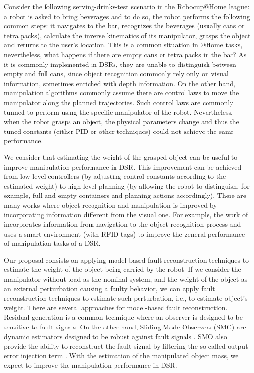 \documentclass[conference,letterpaper]{ieeeconf}
\begin{document}
Consider the following serving-drinks-test scenario in the Robocup@Home league: a robot is asked to bring beverages and to do so, the robot performs the following common steps: it navigates to the bar, recognizes the beverages (usually cans or tetra packs), calculate the inverse kinematics of its manipulator, grasps the object and returns to the user's location. This is a common situation in @Home tasks, nevertheless, what happens if there are empty cans or tetra packs in the bar? As it is commonly implemented in DSRs, they are unable to distinguish between empty and full cans, since object recognition commonly rely only on visual information, sometimes enriched with depth information. On the other hand, manipulation algorithms commonly assume there are control laws to move the manipulator along the planned trajectories. Such control laws are commonly tunned to perform using the specific manipulator of the robot. Nevertheless, when the robot grasps an object, the physical parameters change and thus the tuned constants (either PID or other techniques) could not achieve the same performance.

We consider that estimating the weight of the grasped object can be useful to improve manipulation performance in DSR. This improvement can be achieved from low-level controllers (by adjusting control constants according to the estimated weight) to high-level planning (by allowing the robot to distinguish, for example, full and empty containers and planning actions accordingly). There are many works where object recognition and manipulation is improved by incorporating information different from the visual one. For example, the work of \cite{ekvall_integrating_2006} incorporates information from navigation to the object recognition process and \cite{jae-han_park_new_2007} uses a smart environment (with RFID tags) to improve the general performance of manipulation tasks of a DSR. 

Our proposal consists on applying model-based fault reconstruction techniques \cite{ding2013model} to estimate the weight of the object being carried by the robot. If we consider the manipulator without load  as the nominal system, and the weight of the object as an external perturbation causing a faulty behavior, we can apply fault reconstruction techniques to estimate such perturbation, i.e., to estimate object's weight. There are several approaches for model-based fault reconstruction. Residual generation is a common technique where an observer is designed to be sensitive to fault signals. On the other hand, Sliding Mode Observers (SMO) are dynamic estimators designed to be robust against fault signals \cite{shtessel2014sliding}. SMO also provide the ability to reconstruct the fault signal by filtering the so called output error injection term \cite{alwi2011fault}. With the estimation of the manipulated object mass, we expect to improve the manipulation performance in DSR. 
\end{document}
